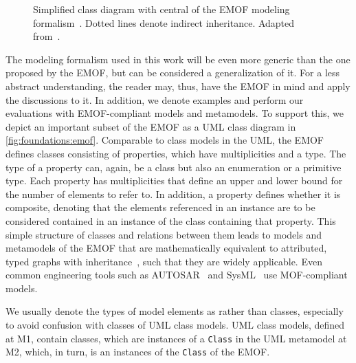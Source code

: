 \begin{figure}
    \centering
    
    \caption[Relevant subset of the \acrshort{EMOF} modeling formalism]{Simplified class diagram with central \metaclasses of the \gls{EMOF} modeling formalism~\cite[p.~27]{mof}. Dotted lines denote indirect inheritance. Adapted from~\cite[Fig.~2.2]{kramer2017a}.}
    \label{fig:foundations:emof}
\end{figure}

The modeling formalism used in this work will be even more generic than the one proposed by the \gls{EMOF}, but can be considered a generalization of it.
For a less abstract understanding, the reader may, thus, have the \gls{EMOF} in mind and apply the discussions to it.
In addition, we denote examples and perform our evaluations with \gls{EMOF}-compliant models and metamodels.
To support this, we depict an important subset of the \gls{EMOF} \metametamodel as a \gls{UML} class diagram in \autoref{fig:foundations:emof}.
Comparable to class models in the \gls{UML}, the \gls{EMOF} defines classes consisting of properties, which have multiplicities and a type.
The type of a property can, again, be a class but also an enumeration or a primitive type.
Each property has multiplicities that define an upper and lower bound for the number of elements to refer to.
In addition, a property defines whether it is composite, denoting that the elements referenced in an instance are to be considered contained in an instance of the class containing that property.
This simple structure of classes and relations between them leads to models and metamodels of the \gls{EMOF} that are mathematically equivalent to attributed, typed graphs with inheritance~\cite[Sec.~2.1.3.1]{kramer2017a}, such that they are widely applicable.
Even common engineering tools such as AUTOSAR~\cite{scheid2015autosar} and SysML~\cite{sysml} use \gls{MOF}-compliant models.

We usually denote the types of model elements as \emph{\metaclasses} rather than classes, especially to avoid confusion with classes of \gls{UML} class models.
\gls{UML} class models, defined at M1, contain classes, which are instances of a \texttt{Class} \metaclass in the \gls{UML} metamodel at M2, which, in turn, is an instances of the \texttt{Class} \metaclass of the \gls{EMOF}.

